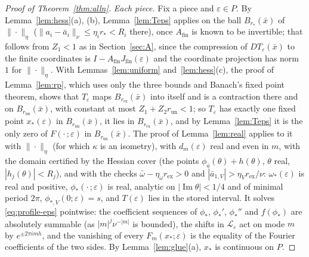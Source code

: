 \documentclass[11pt]{article}
\theoremstyle{definition}
\newcommand{\im}{\operatorname{Im}}
\begin{document}
\begin{proof}[Proof of Theorem~\ref{thm:alln}]
\emph{Each piece.} Fix a piece and $\varepsilon \in P$. By Lemma~\ref{lem:hess}(a), (b), Lemma~\ref{lem:Teps} applies on the ball $B_{r_*}(\bar x)$ of $\|\cdot\|_\eta$ ($\|a_i - \bar a_i\|_\nu \le \eta_ir_* < R_i$ there), once $A_{\mathrm{fin}}$ is known to be invertible; that follows from $Z_1 < 1$ as in Section~\ref{sec:A}, since the compression of $DT_\varepsilon(\bar x)$ to the finite coordinates is $I - A_{\mathrm{fin}}J_{\mathrm{fin}}(\varepsilon)$ and the coordinate projection has norm $1$ for $\|\cdot\|_\eta$. With Lemmas~\ref{lem:uniform} and~\ref{lem:hess}(c), the proof of Lemma~\ref{lem:rp}, which uses only the three bounds and Banach's fixed point theorem, shows that $T_\varepsilon$ maps $B_{r_{\mathrm{ex}}}(\bar x)$ into itself and is a contraction there and on $B_{r_{\mathrm{un}}}(\bar x)$, with constant at most $Z_1 + Z_2r_{\mathrm{un}} < 1$; so $T_\varepsilon$ has exactly one fixed point $x_*(\varepsilon)$ in $B_{r_{\mathrm{un}}}(\bar x)$, it lies in $B_{r_{\mathrm{ex}}}(\bar x)$, and by Lemma~\ref{lem:Teps} it is the only zero of $F(\cdot\,;\varepsilon)$ in $B_{r_{\mathrm{un}}}(\bar x)$. The proof of Lemma~\ref{lem:real} applies to it with $\|\cdot\|_\eta$ (for which $\kappa$ is an isometry), with $d_m(\varepsilon)$ real and even in $m$, with the domain certified by the Hessian cover (the points $\phi_{\bar a}(\theta) + h(\theta)$, $\theta$ real, $|h_j(\theta)| < R_j$), and with the checks $\bar\omega - \eta_\omega r_{\mathrm{ex}} > 0$ and $|\bar a_{1,V}| > \eta_Vr_{\mathrm{ex}}/\nu$: $\omega_*(\varepsilon)$ is real and positive, $\phi_*(\cdot\,;\varepsilon)$ is real, analytic on $|\im\theta| < 1/4$ and of minimal period $2\pi$, $\phi_{*,V}(0;\varepsilon) = s$, and $T(\varepsilon)$ lies in the stored interval. It solves \eqref{eq:profile-eps} pointwise: the coefficient sequences of $\phi_*$, $\phi_*'$, $\phi_*''$ and $f(\phi_*)$ are absolutely summable (as $|m|^j\nu^{-|m|}$ is bounded), the shifts in $\mathcal L_\varepsilon$ act on mode $m$ by $e^{\pm2\pi imh}$, and the vanishing of every $F_m(x_*;\varepsilon)$ is the equality of the Fourier coefficients of the two sides. By Lemma~\ref{lem:glue}(a), $x_*$ is continuous on $P$.


\end{proof}
\end{document}
